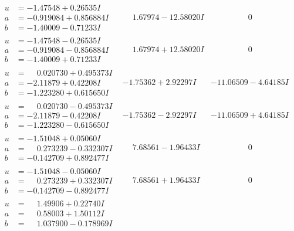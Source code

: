 \documentclass[1p]{elsarticle_modified}
\theoremstyle{definition}
\begin{document}
$$\begin{array}{c|c|c}
 \hline 
\begin{aligned}
u &= -1.47548 + 0.26535 I \\
a &= -0.919084 + 0.856884 I \\
b &= -1.40009 - 0.71233 I\end{aligned}
 & \phantom{-}1.67974 - 12.58020 I & \phantom{-0.000000 } 0 \\ \hline\begin{aligned}
u &= -1.47548 - 0.26535 I \\
a &= -0.919084 - 0.856884 I \\
b &= -1.40009 + 0.71233 I\end{aligned}
 & \phantom{-}1.67974 + 12.58020 I & \phantom{-0.000000 } 0 \\ \hline\begin{aligned}
u &= \phantom{-}0.020730 + 0.495373 I \\
a &= -2.11879 + 0.42208 I \\
b &= -1.223280 + 0.615650 I\end{aligned}
 & -1.75362 + 2.92297 I & -11.06509 - 4.64185 I \\ \hline\begin{aligned}
u &= \phantom{-}0.020730 - 0.495373 I \\
a &= -2.11879 - 0.42208 I \\
b &= -1.223280 - 0.615650 I\end{aligned}
 & -1.75362 - 2.92297 I & -11.06509 + 4.64185 I \\ \hline\begin{aligned}
u &= -1.51048 + 0.05060 I \\
a &= \phantom{-}0.273239 - 0.332307 I \\
b &= -0.142709 + 0.892477 I\end{aligned}
 & \phantom{-}7.68561 - 1.96433 I & \phantom{-0.000000 } 0 \\ \hline\begin{aligned}
u &= -1.51048 - 0.05060 I \\
a &= \phantom{-}0.273239 + 0.332307 I \\
b &= -0.142709 - 0.892477 I\end{aligned}
 & \phantom{-}7.68561 + 1.96433 I & \phantom{-0.000000 } 0 \\ \hline\begin{aligned}
u &= \phantom{-}1.49906 + 0.22740 I \\
a &= \phantom{-}0.58003 + 1.50112 I \\
b &= \phantom{-}1.037900 - 0.178969 I\end{aligned}

\end{array}$$
\end{document}
